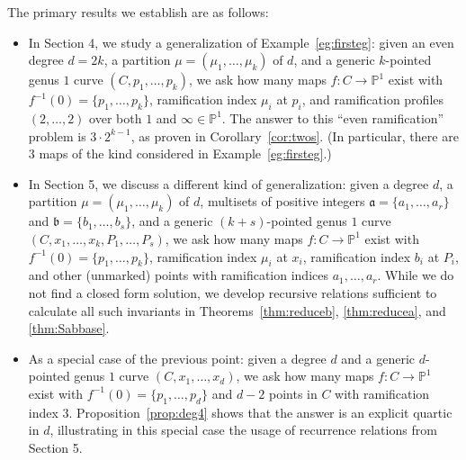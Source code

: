 \documentclass[thesis]{thesis-umich}           %
\renewcommand{\a}{\mathfrak a}
\renewcommand{\b}{\mathfrak b}
\renewcommand{\P}{\mathbb P}
\theoremstyle{definition}
\begin{document}
The primary results we establish are as follows:
\begin{itemize}
\item In Section 4, we study a generalization of Example~\ref{eg:firsteg}: given
  an even degree $d=2k$, a partition $\mu=(\mu_1,\dots,\mu_k)$ of $d$, and a generic
  $k$-pointed genus $1$ curve $(C,p_1,\dots,p_k)$, we ask how many maps
  $f:C\to\P^1$ exist with $f^{-1}(0)=\{p_1,\dots,p_k\}$, ramification index $\mu_i$
  at $p_i$, and ramification profiles $(2,\dots,2)$ over both $1$ and $\infty\in\P^1$.
  The answer to this ``even ramification'' problem is $3\cdot 2^{k-1}$, as
  proven in Corollary~\ref{cor:twos}. (In particular, there are $3$ maps of
  the kind considered in Example~\ref{eg:firsteg}.)
\item In Section 5, we discuss a different kind of generalization: given
  a degree $d$, a partition $\mu=(\mu_1,\dots,\mu_k)$ of $d$, multisets of positive integers $\a=\{a_1,\dots,a_r\}$ and $\b=\{b_1,\dots,b_s\}$,
  and a generic $(k+s)$-pointed genus $1$ curve $(C,x_1,\dots,x_k,P_1,\dots,P_s)$,
  we ask how many maps $f:C\to\P^1$ exist with $f^{-1}(0)=\{p_1,\dots,p_k\}$, ramification
  index $\mu_i$ at $x_i$, ramification index $b_i$ at $P_i$, and other (unmarked) points
  with ramification indices $a_1,\dots,a_r$.
  While we do not find a closed form solution, we develop recursive relations sufficient
  to calculate all such invariants in Theorems~\ref{thm:reduceb}, \ref{thm:reducea}, and \ref{thm:Sabbase}.
\item As a special case of the previous point: given a degree $d$ and a generic $d$-pointed genus $1$ curve $(C,x_1,\dots,x_d)$, we ask
  how many maps $f:C\to\P^1$ exist with $f^{-1}(0)=\{p_1,\dots,p_d\}$ and $d-2$ points in $C$ with ramification index $3$. Proposition~\ref{prop:deg4} shows that the answer is an explicit quartic in $d$, illustrating in this special case the usage of recurrence relations from Section 5.
  
  \end{itemize}
\end{document}
